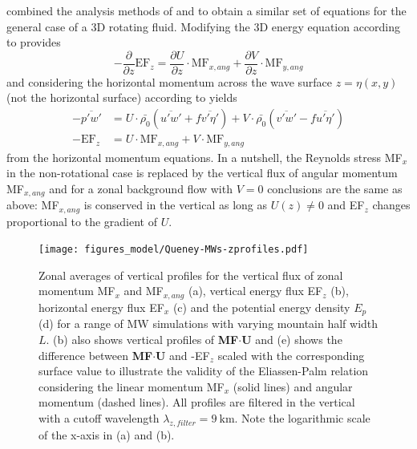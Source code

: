 \textcite[]{broad_linear_1995} combined the analysis methods of \textcite[]{eliassen_transfer_1960} and \textcite[]{bretherton_momentum_1969} to obtain a similar set of equations for the general case of a 3D rotating fluid. Modifying the 3D energy equation according to \textcite[]{eliassen_transfer_1960} provides 
\begin{equation}
    -\frac{\partial}{\partial z} \mathrm{EF}_z = \frac{\partial U}{\partial z} \cdot \mathrm{MF}_{x,ang} + \frac{\partial V}{\partial z} \cdot \mathrm{MF}_{y,ang}
    \label{equ:EP-relation-rotating-dudz}
\end{equation}
and considering the horizontal momentum across the wave surface $z=\eta(x,y)$ (not the horizontal surface) according to \textcite[]{bretherton_momentum_1969} yields
\begin{equation}
    \begin{aligned}
        -\overbar{p'w'}& = U \cdot \bar{\rho_0} (\overbar{u'w'} + f \overbar{v' \eta'}) + V \cdot \bar{\rho_0} (\overbar{v'w'} - f \overbar{u' \eta'}) \\
        -\mathrm{EF}_z& = U \cdot \mathrm{MF}_{x,ang} + V \cdot \mathrm{MF}_{y,ang}
    \end{aligned}
    \label{equ:EP-relation-rotating}
\end{equation}
from the horizontal momentum equations. In a nutshell, the Reynolds stress MF$_x$ in the non-rotational case is replaced by the vertical flux of angular momentum MF$_{x,ang}$ and for a zonal background flow with $V=0$ conclusions are the same as above: MF$_{x,ang}$ is conserved in the vertical as long as $U(z) \neq 0$ and EF$_z$ changes proportional to the gradient of $U$.

\begin{figure}[t]
    \centering
    \texttt{[image: figures\_model/Queney-MWs-zprofiles.pdf]}
    \caption{Zonal averages of vertical profiles for the vertical flux of zonal momentum MF$_x$ and MF$_{x,ang}$ (a), vertical energy flux EF$_z$ (b), horizontal energy flux EF$_x$ (c) and the potential energy density $E_p$ (d) for a range of MW simulations with varying mountain half width $L$. (b) also shows vertical profiles of \textbf{MF}$\cdot$\textbf{U} and (e) shows the difference between \textbf{MF}$\cdot$\textbf{U} and -EF$_z$ scaled with the corresponding surface value to illustrate the validity of the Eliassen-Palm relation considering the linear momentum MF$_x$ (solid lines) and angular momentum (dashed lines). All profiles are filtered in the vertical with a cutoff wavelength $\lambda_{z,filter}=\SI{9}{\kilo\meter}$. Note the logarithmic scale of the x-axis in (a) and (b).}
    \label{fig:MWs-zprofiles}
\end{figure}

